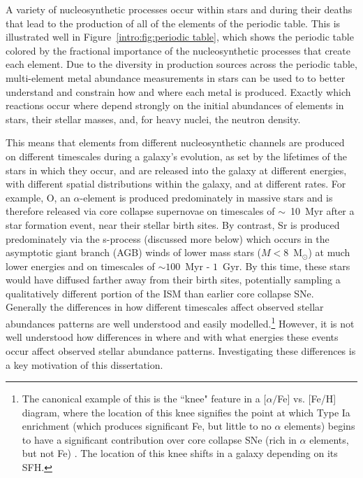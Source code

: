 A variety of nucleosynthetic processes occur within stars and during their deaths that lead to the production of all of the elements of the periodic table. This is illustrated well in Figure~\ref{intro:fig:periodic table}, which shows the periodic table colored by the fractional importance of the nucleosynthetic processes that create each element. Due to the diversity in production sources across the periodic table, multi-element metal abundance measurements in stars can be used to to better understand and constrain how and where each metal is produced. Exactly which reactions occur where depend strongly on the initial abundances of elements in stars, their stellar masses, and, for heavy nuclei, the neutron density. 

This means that elements from different nucleosynthetic channels are produced on different timescales during a galaxy's evolution, as set by the lifetimes of the stars in which they occur, and are released into the galaxy at different energies, with different spatial distributions within the galaxy, and at different rates. For example, O, an $\alpha$-element is produced predominately in massive stars and is therefore released via core collapse supernovae on timescales of $\sim$~10~Myr after a star formation event, near their stellar birth sites. By contrast, Sr is produced predominately via the s-process (discussed more below) which occurs in the asymptotic giant branch (AGB) winds of lower mass stars ($M < 8$~M$_{\odot}$) at much lower energies and on timescales of $\sim 100$~Myr - $1$~Gyr. By this time, these stars would have diffused farther away from their birth sites, potentially sampling a qualitatively different portion of the ISM than earlier core collapse SNe. Generally the differences in how different timescales affect observed stellar abundances patterns are well understood and easily modelled.\footnote{The canonical example of this is the ``knee" feature in a $[\alpha/$Fe] vs. [Fe/H] diagram, where the location of this knee signifies the point at which Type Ia enrichment (which produces significant Fe, but little to no $\alpha$ elements) begins to have a significant contribution over core collapse SNe (rich in $\alpha$ elements, but not Fe) \citep[e.g.[]{MatteucciBrocato1990, Geisler2005, Hill2018}. The location of this knee shifts in a galaxy depending on its SFH.} However, it is not well understood how differences in where and with what energies these events occur affect observed stellar abundance patterns. Investigating these differences is a key motivation of this dissertation.


